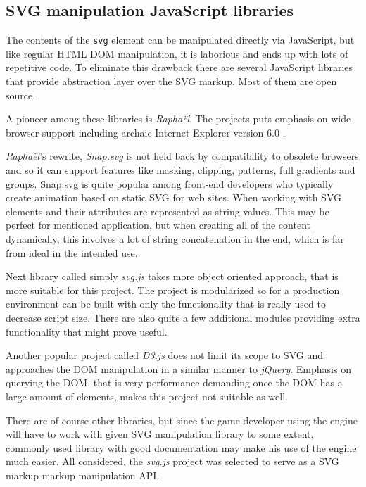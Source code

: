 \documentclass[11pt,oneside, final]{fithesis2}
\begin{document}
\subsection{SVG manipulation JavaScript libraries}
The contents of the \texttt{svg} element can be manipulated directly via JavaScript, but like regular HTML DOM manipulation, it is laborious and ends up with lots of repetitive code. To eliminate this drawback there are several JavaScript libraries that provide abstraction layer over the SVG markup. Most of them are open source.

A pioneer among these libraries is \emph{Raphaël}. The projects puts emphasis on wide browser support including archaic Internet Explorer version 6.0 \cite{raphael}.

\emph{Raphaël}'s rewrite, \emph{Snap.svg} is not held back by compatibility to obsolete browsers and so it can support features like masking, clipping, patterns, full gradients and groups\cite{snap}. Snap.svg is quite popular among front-end developers who typically create animation based on static SVG for web sites\cite{snapusage}. When working with SVG elements and their attributes are represented as string values. This may be perfect for mentioned application, but when creating all of the content dynamically, this involves a lot of string concatenation in the end, which is far from ideal in the intended use.

Next library called simply \emph{svg.js} takes more object oriented approach\cite{svgjs}, that is more suitable for this project. The project is modularized so for a production environment can be built with only the functionality that is really used to decrease script size. There are also quite a few additional modules providing extra functionality that might prove useful.

Another popular project called \emph{D3.js} does not limit its scope to SVG and approaches the DOM manipulation in a similar manner to \emph{jQuery}\cite{d3js}. Emphasis on querying the DOM, that is very performance demanding once the DOM has a large amount of elements, makes this project not suitable as well.

There are of course other libraries, but since the game developer using the engine will have to work with given SVG manipulation library to some extent, commonly used library with good documentation may make his use of the engine much easier. All considered, the \emph{svg.js} project was selected to serve as a SVG markup markup manipulation API.
\end{document}
